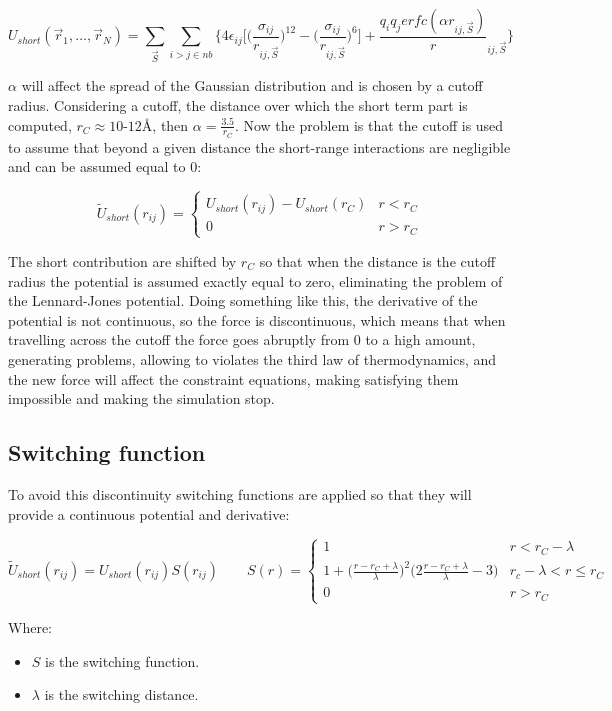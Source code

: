 $$U_{short}(\vec{r}_1, \dots, \vec{r}_N) = \sum\limits_{\vec{S}}\sum\limits_{i>j\in nb}\biggl\{4\epsilon_{ij}\biggl[\biggl(\frac{\sigma_{ij}}{r_{ij, \vec{S}}}\biggr)^{12} - \biggl(\frac{\sigma_{ij}}{r_{ij, \vec{S}}}\biggr)^{6}\biggr] + \frac{q_iq_jerfc(\alpha r_{ij, \vec{S}})}r_{ij, \vec{S}}\biggr\}$$


$\alpha$ will affect the spread of the Gaussian distribution and is chosen by a cutoff radius.
Considering a cutoff, the distance over which the short term part is computed, $r_C\approx 10$-$12\si{\angstrom}$, then $\alpha = \frac{3.5}{r_C}$.
Now the problem is that the cutoff is used to assume that beyond a given distance the short-range interactions are negligible and can be assumed equal to $0$:

$$\tilde{U}_{short}(r_{ij}) = \begin{cases} U_{short}(r_{ij}) - U_{short}(r_C) & r<r_C\\ 0 & r>r_C\end{cases}$$

The short contribution are shifted by $r_C$ so that when the distance is the cutoff radius the potential is assumed exactly equal to zero, eliminating the problem of the Lennard-Jones potential.
Doing something like this, the derivative of the potential is not continuous, so the force is discontinuous, which means that when travelling across the cutoff the force goes abruptly from $0$ to a high amount, generating problems, allowing to violates the third law of thermodynamics, and the new force will affect the constraint equations, making satisfying them impossible and making the simulation stop.

	\subsection{Switching function}
	To avoid this discontinuity switching functions are applied so that they will provide a continuous potential and derivative:

	$$\tilde{U}_{short}(r_{ij}) = U_{short}(r_{ij})S(r_{ij})\qquad S(r) = \begin{cases} 1 & r<r_C-\lambda\\ 1 + \biggl(\frac{r-r_C+\lambda}{\lambda}\biggr)^2\biggl(2\frac{r-r_C + \lambda}{\lambda} - 3\biggr) & r_c -\lambda < r\le r_C\\0 & r> r_C\end{cases}$$

	Where:

	\begin{multicols}{2}
		\begin{itemize}
			\item $S$ is the switching function.
			\item $\lambda$ is the switching distance.
		\end{itemize}
	\end{multicols}

